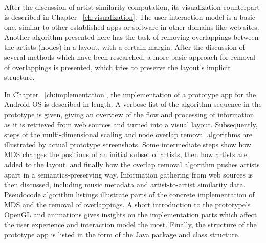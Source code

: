 After the discussion of artist similarity computation, its visualization counterpart is described in Chapter ~\ref{ch:visualization}. The user interaction model is a basic one, similar to other established apps or software in other domains like web sites. Another algorithm presented here has the task of removing overlappings between the artists (nodes) in a layout, with a certain margin. After the discussion of several methods which have been researched, a more basic approach for removal of overlappings is presented, which tries to preserve the layout's implicit structure.

In Chapter ~\ref{ch:implementation}, the implementation of a prototype app for the Android OS is described in length. A verbose list of the algorithm sequence in the prototype is given, giving an overview of the flow and processing of information as it is retrieved from web sources and turned into a visual layout. Subsequently, steps of the multi-dimensional scaling and node overlap removal algorithms are illustrated by actual prototype screenshots. Some intermediate steps show how MDS changes the positions of an initial subset of artists, then how artists are added to the layout, and finally how the overlap removal algorithm pushes artists apart in a semantics-preserving way. Information gathering from web sources is then discussed, including music metadata and artist-to-artist similarity data. Pseudocode algorithm listings illustrate parts of the concrete implementation of MDS and the removal of overlappings. A short introduction to the prototype's OpenGL and animations gives insights on the implementation parts which affect the user experience and interaction model the most. Finally, the structure of the prototype app is listed in the form of the Java package and class structure.

